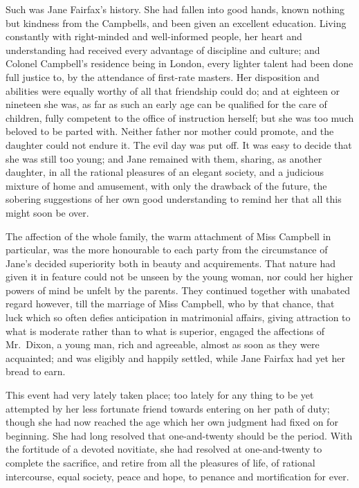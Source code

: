 Such was Jane Fairfax's history.  She had fallen into good hands,
known nothing but kindness from the Campbells, and been given
an excellent education.  Living constantly with right-minded
and well-informed people, her heart and understanding had received
every advantage of discipline and culture; and Colonel Campbell's
residence being in London, every lighter talent had been done
full justice to, by the attendance of first-rate masters.
Her disposition and abilities were equally worthy of all that
friendship could do; and at eighteen or nineteen she was, as far
as such an early age can be qualified for the care of children,
fully competent to the office of instruction herself; but she
was too much beloved to be parted with.  Neither father nor mother
could promote, and the daughter could not endure it.  The evil day
was put off.  It was easy to decide that she was still too young;
and Jane remained with them, sharing, as another daughter, in all
the rational pleasures of an elegant society, and a judicious
mixture of home and amusement, with only the drawback of the future,
the sobering suggestions of her own good understanding to remind
her that all this might soon be over.

The affection of the whole family, the warm attachment of Miss
Campbell in particular, was the more honourable to each party
from the circumstance of Jane's decided superiority both in beauty
and acquirements.  That nature had given it in feature could not
be unseen by the young woman, nor could her higher powers of mind
be unfelt by the parents.  They continued together with unabated
regard however, till the marriage of Miss Campbell, who by that chance,
that luck which so often defies anticipation in matrimonial affairs,
giving attraction to what is moderate rather than to what is superior,
engaged the affections of Mr.\ Dixon, a young man, rich and agreeable,
almost as soon as they were acquainted; and was eligibly
and happily settled, while Jane Fairfax had yet her bread to earn.

This event had very lately taken place; too lately for any thing to be
yet attempted by her less fortunate friend towards entering on her path
of duty; though she had now reached the age which her own judgment
had fixed on for beginning.  She had long resolved that one-and-twenty
should be the period.  With the fortitude of a devoted novitiate,
she had resolved at one-and-twenty to complete the sacrifice,
and retire from all the pleasures of life, of rational intercourse,
equal society, peace and hope, to penance and mortification for ever.

